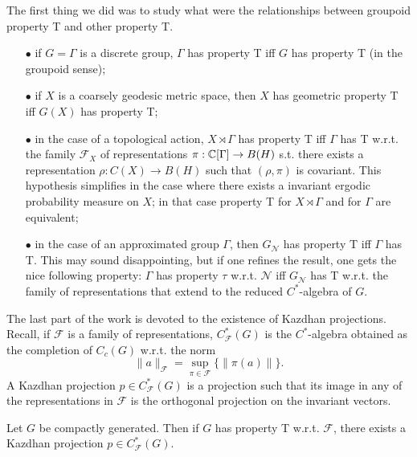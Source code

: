 The first thing we did was to study what were the relationships between groupoid property T and other property T.\\

\begin{itemize}
\item[$\bullet$] if $G=\Gamma$ is a discrete group, $\Gamma$ has property T iff $G$ has property T (in the groupoid sense);\\
\item[$\bullet$] if $X$ is a coarsely geodesic metric space, then $X$ has geometric property T iff $G(X)$ has property T;\\
\item[$\bullet$] in the case of a topological action, $X\rtimes \Gamma$ has property T iff $\Gamma$ has T w.r.t. the family $\mathcal{F}_X$ of representations $\pi : \mathbb C[\Gamma]\rightarrow B(H) $ s.t. there exists a representation $\rho: C(X) \rightarrow B(H)$ such that $(\rho, \pi) $ is covariant. This hypothesis simplifies in the case where there exists a invariant ergodic probability measure on $X$; in that case property T for $X\rtimes \Gamma$ and for $\Gamma$ are equivalent;\\
\item[$\bullet$] in the case of an approximated group $\Gamma$, then $G_\mathcal{N}$ has property T iff $\Gamma$ has T. This may sound disappointing, but if one refines the result, one gets the nice following property: $\Gamma$ has property $\tau$ w.r.t. $\mathcal{N}$ iff $G_\mathcal{N}$ has T w.r.t. the family of representations that extend to the reduced $C^*$-algebra of $G$.\\
\end{itemize} 

The last part of the work is devoted to the existence of Kazdhan projections. Recall, if $\mathcal{F}
$ is a family of representations, $C^*_\mathcal{F}(G)$ is the $C^*$-algebra obtained as the completion of $C_c(G)$ w.r.t. the norm
\[\| a \|_\mathcal{F} = \sup_{\pi \in \mathcal{F}} \{ \| \pi(a) \|\}. \]
A Kazdhan projection $p\in C^*_\mathcal{F}(G)$ is a projection such that its image in any of the representations in $\mathcal{F}$ is the orthogonal projection on the invariant vectors.\\

\begin{thm}
Let $G$ be compactly generated. Then if $G$ has property T w.r.t. $\mathcal{F}$, there exists a Kazdhan projection $p\in C^*_\mathcal{F}(G)$. 
\end{thm}

